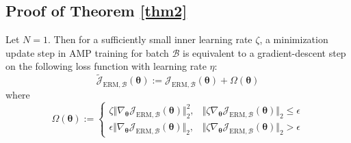 \documentclass[final]{cvpr}
\newenvironment{innerthm}[1]
  {\renewcommand\theinnercustomthm{#1}\innercustomthm}
  {\endinnercustomthm}
\begin{document}
\subsection{Proof of Theorem \ref{thm2}}\label{app:b}

\begin{innerthm}{2}
Let $N=1$. Then for a sufficiently small inner learning rate $\zeta$, a minimization update step in AMP training for batch $\mathcal{B}$ is equivalent to a gradient-descent step on the following loss function with learning rate $\eta$:
\begin{equation*}
\widetilde{\mathcal{J}}_{\mathrm{ERM},\mathcal{B}}(\boldsymbol{\theta}):=\mathcal{J}_{\mathrm{ERM},\mathcal{B}}(\boldsymbol{\theta})+\Omega(\boldsymbol{\theta})
\end{equation*}
where
\begin{equation*}
\Omega(\boldsymbol{\theta}):=\begin{cases}
\zeta\Vert\nabla_{\boldsymbol{\theta}}\mathcal{J}_{\mathrm{ERM},\mathcal{B}}(\boldsymbol{\theta})\Vert_2^2,&\Vert\zeta\nabla_{\boldsymbol{\theta}}\mathcal{J}_{\mathrm{ERM},\mathcal{B}}(\boldsymbol{\theta})\Vert_2\le\epsilon\\
\epsilon\Vert\nabla_{\boldsymbol{\theta}}\mathcal{J}_{\mathrm{ERM},\mathcal{B}}(\boldsymbol{\theta})\Vert_2,&\Vert\zeta\nabla_{\boldsymbol{\theta}}\mathcal{J}_{\mathrm{ERM},\mathcal{B}}(\boldsymbol{\theta})\Vert_2>\epsilon
\end{cases}
\end{equation*}
\end{innerthm}
\end{document}
